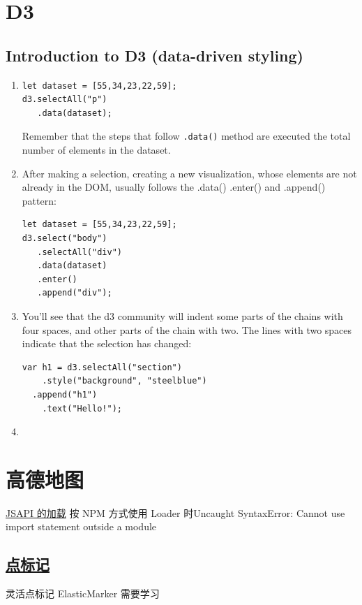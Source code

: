 \documentclass[a4paper, 12pt]{article}
\begin{document}
\section{D3}
\subsection{Introduction to D3 (data-driven styling)}
\begin{enumerate}
\item 
\begin{verbatim}
let dataset = [55,34,23,22,59];
d3.selectAll("p")
   .data(dataset);
\end{verbatim}
Remember that the steps that follow \verb|.data()| method are executed the total number of elements in the dataset.

\item 
After making a selection, creating a new visualization, whose elements are not already in the DOM, usually follows the .data() .enter() and .append() pattern:
\begin{verbatim}
let dataset = [55,34,23,22,59];
d3.select("body")
   .selectAll("div")
   .data(dataset)
   .enter()
   .append("div");
\end{verbatim}

\item You'll see that the d3 community will indent some parts of the chains with four spaces, and other parts of the chain with two. The lines with two spaces indicate that the selection has changed:
\begin{verbatim}
var h1 = d3.selectAll("section")
    .style("background", "steelblue")
  .append("h1")
    .text("Hello!");
\end{verbatim}

\item 

\end{enumerate}


\section{高德地图}
\href{https://lbs.amap.com/api/jsapi-v2/guide/abc/load}{JSAPI 的加载} 按 NPM 方式使用 Loader 时{\color{red}Uncaught SyntaxError: Cannot use import statement outside a module}

\subsection{\href{https://lbs.amap.com/api/jsapi-v2/guide/overlays/marker}{点标记}}
灵活点标记 ElasticMarker 需要学习
\end{document}
